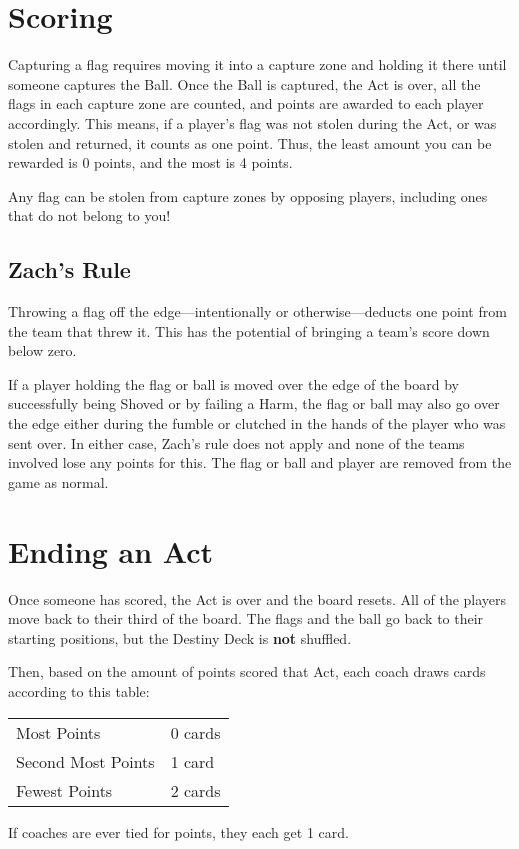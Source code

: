 \section{Scoring} \label{scoring}
Capturing a flag requires moving it into a capture zone and holding it there until someone captures the Ball.
Once the Ball is captured, the Act is over, all the flags in each capture zone are counted, and points are awarded to each player accordingly.
This means, if a player's flag was not stolen during the Act, or was stolen and returned, it counts as one point.
Thus, the least amount you can be rewarded is 0 points, and the most is 4 points.

\begin{note}
    Any flag can be stolen from capture zones by opposing players, including ones that do not belong to you!
\end{note}

\subsection{Zach's Rule}
Throwing a flag off the edge---intentionally or otherwise---deducts one point from the team that threw it.
This has the potential of bringing a team's score down below zero.

\begin{note}
    If a player holding the flag or ball is moved over the edge of the board by successfully being Shoved or by failing a Harm, the flag or ball may also go over the edge either during the fumble or clutched in the hands of the player who was sent over.
    In either case, Zach's rule does not apply and none of the teams involved lose any points for this.
    The flag or ball and player are removed from the game as normal.
\end{note}

\newpage\section{Ending an Act}
Once someone has scored, the Act is over and the board resets. All of the players move back to their third of the board. The flags and the ball go back to their starting positions, but the Destiny Deck is \textbf{not} shuffled.

Then, based on the amount of points scored that Act, each coach draws cards according to this table:
\begin{center}
\begin{tabular}{ll}
    Most Points & 0 cards\\
    Second Most Points & 1 card\\
    Fewest Points & 2 cards\\
\end{tabular}
\end{center}
If coaches are ever tied for points, they each get 1 card.
